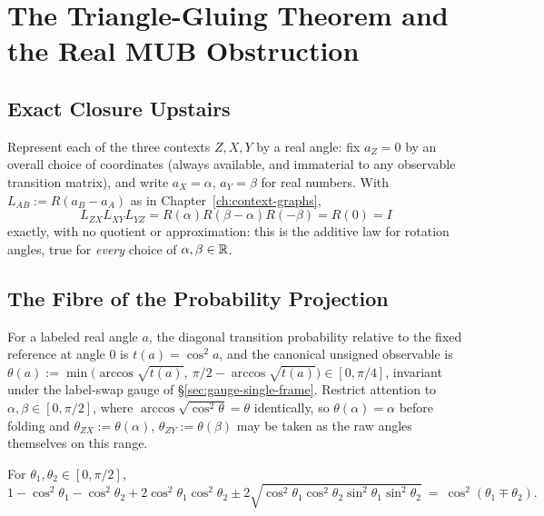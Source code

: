 \chapter{The Triangle-Gluing Theorem and the Real MUB Obstruction}
\label{ch:real-mub-obstruction}

\section{Exact Closure Upstairs}

Represent each of the three contexts $Z,X,Y$ by a real angle: fix $a_Z = 0$ by
an overall choice of coordinates (always available, and immaterial to any
observable transition matrix), and write $a_X = \alpha$, $a_Y = \beta$ for
real numbers. With $L_{AB} := R(a_B - a_A)$ as in
Chapter~\ref{ch:context-graphs},
\begin{equation}
L_{ZX} L_{XY} L_{YZ} = R(\alpha) R(\beta-\alpha) R(-\beta) = R(0) = I
\label{eq:exact-closure-explicit}
\end{equation}
exactly, with no quotient or approximation: this is the additive law for
rotation angles, true for \emph{every} choice of $\alpha,\beta \in \mathbb{R}$.

\section{The Fibre of the Probability Projection}

For a labeled real angle $a$, the diagonal transition probability relative to
the fixed reference at angle $0$ is $t(a) = \cos^2 a$, and the canonical
unsigned observable is $\theta(a) := \min\big(\arccos\sqrt{t(a)},\ \pi/2 -
\arccos\sqrt{t(a)}\big) \in [0,\pi/4]$, invariant under the label-swap gauge
of \S\ref{sec:gauge-single-frame}. Restrict attention to $\alpha,\beta \in
[0,\pi/2]$, where $\arccos\sqrt{\cos^2\theta} = \theta$ identically, so
$\theta(\alpha)=\alpha$ before folding and $\theta_{ZX} := \theta(\alpha)$,
$\theta_{ZY} := \theta(\beta)$ may be taken as the raw angles themselves on
this range.

\begin{lemma}
\label{lem:closed-form}
For $\theta_1,\theta_2 \in [0,\pi/2]$,
\begin{equation}
1 - \cos^2\theta_1 - \cos^2\theta_2 + 2\cos^2\theta_1\cos^2\theta_2 \pm
2\sqrt{\cos^2\theta_1\cos^2\theta_2\sin^2\theta_1\sin^2\theta_2} \ =\
\cos^2(\theta_1 \mp \theta_2).
\end{equation}
\end{lemma}

